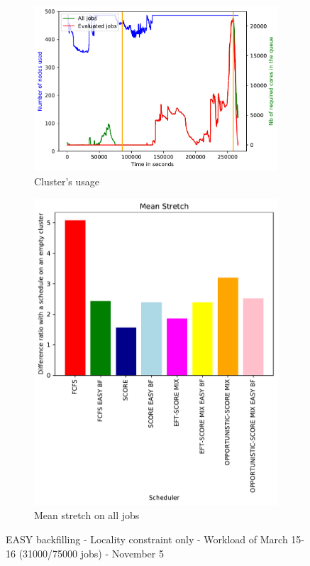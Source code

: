 \documentclass[a4paper]{article}
\begin{document}
\begin{figure}[H]\centering
\begin{subfigure}[b]{0.4\linewidth}\centering\includegraphics[width=1\linewidth]{MBSS/plot/2022-03-15->2022-03-16_V9271_Fcfs_Used_nodes_450_128_32_256_4_1024.pdf}\caption{Cluster's usage}\end{subfigure}
\begin{subfigure}[b]{0.4\linewidth}\centering\includegraphics[width=0.9\linewidth]{MBSS/plot/Results_FCFS_Score_Easy_Backfill_2022-03-15->2022-03-16_V9271_Mean_Stretch_450_128_32_256_4_1024.pdf}\caption{Mean stretch on all jobs}\end{subfigure}
\caption{EASY backfilling - Locality constraint only - Workload of March 15-16 (31000/75000 jobs) - November 5}\end{figure}
\end{document}
